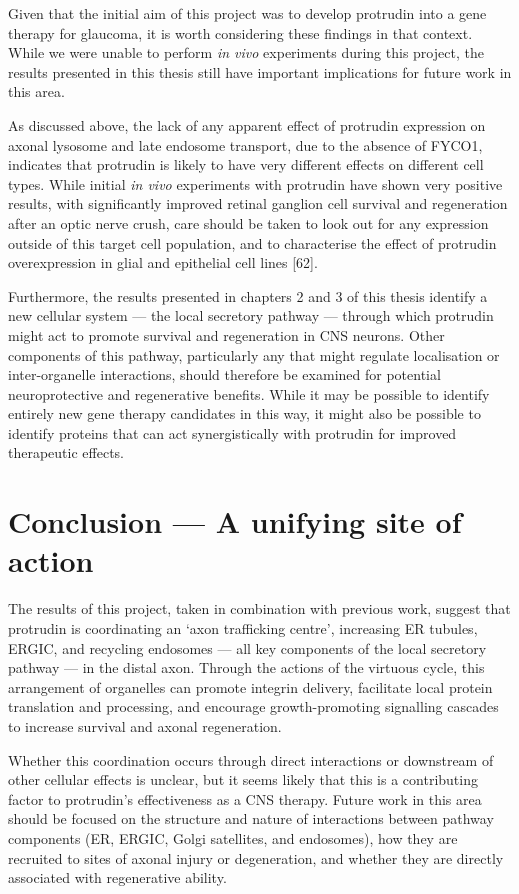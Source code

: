 \documentclass[
  12pt,
  a4paper,
]{book}
\begin{document}
Given that the initial aim of this project was to develop protrudin into a gene therapy for glaucoma, it is worth considering these findings in that context. While we were unable to perform \emph{in vivo} experiments during this project, the results presented in this thesis still have important implications for future work in this area.

As discussed above, the lack of any apparent effect of protrudin expression on axonal lysosome and late endosome transport, due to the absence of FYCO1, indicates that protrudin is likely to have very different effects on different cell types. While initial \emph{in vivo} experiments with protrudin have shown very positive results, with significantly improved retinal ganglion cell survival and regeneration after an optic nerve crush, care should be taken to look out for any expression outside of this target cell population, and to characterise the effect of protrudin overexpression in glial and epithelial cell lines {[}62{]}.

Furthermore, the results presented in chapters 2 and 3 of this thesis identify a new cellular system --- the local secretory pathway --- through which protrudin might act to promote survival and regeneration in CNS neurons. Other components of this pathway, particularly any that might regulate localisation or inter-organelle interactions, should therefore be examined for potential neuroprotective and regenerative benefits. While it may be possible to identify entirely new gene therapy candidates in this way, it might also be possible to identify proteins that can act synergistically with protrudin for improved therapeutic effects.

\section{Conclusion --- A unifying site of action}\label{conclusion-a-unifying-site-of-action}

The results of this project, taken in combination with previous work, suggest that protrudin is coordinating an `axon trafficking centre', increasing ER tubules, ERGIC, and recycling endosomes --- all key components of the local secretory pathway --- in the distal axon. Through the actions of the virtuous cycle, this arrangement of organelles can promote integrin delivery, facilitate local protein translation and processing, and encourage growth-promoting signalling cascades to increase survival and axonal regeneration.

Whether this coordination occurs through direct interactions or downstream of other cellular effects is unclear, but it seems likely that this is a contributing factor to protrudin's effectiveness as a CNS therapy. Future work in this area should be focused on the structure and nature of interactions between pathway components (ER, ERGIC, Golgi satellites, and endosomes), how they are recruited to sites of axonal injury or degeneration, and whether they are directly associated with regenerative ability.
\end{document}
